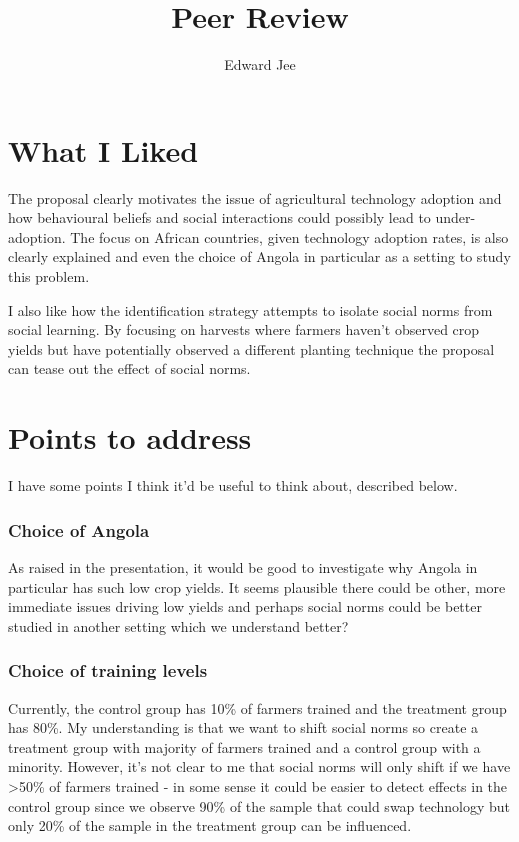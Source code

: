 \documentclass{article}
\title{Peer Review}
\author{Edward Jee}
\begin{document}
\maketitle



\section*{What I Liked}


The proposal clearly motivates the issue of agricultural technology adoption and 
how behavioural beliefs and social interactions could possibly lead to 
under-adoption. The focus on African countries, given technology adoption rates, 
is also clearly explained and even the choice of Angola in particular as a 
setting to study this problem.


I also like how the identification strategy attempts to isolate social norms 
from social learning. By focusing on harvests where farmers haven't observed 
crop yields but have potentially observed a different planting technique the 
proposal can tease out the effect of social norms. 

\section*{Points to address}


I have some points I think it'd be useful to think about, described below.


\subsubsection*{Choice of Angola}
As raised in the presentation, it would be good to investigate why Angola in 
particular has such low crop yields. It seems plausible there could be other, 
more immediate issues driving low yields and perhaps social norms could be 
better studied in another setting which we understand better?



\subsubsection*{Choice of training levels}

Currently, the control group has 10\% of farmers trained and the treatment group 
has 80\%. My understanding is that we want to shift social norms so create a 
treatment group with majority of farmers trained and a control group with a 
minority. However, it's not clear to me that social norms will only shift if we 
have >50\% of farmers trained - in some sense it could be easier to detect 
effects in the control group since we observe 90\% of the sample that could 
swap technology but only 20\% of the sample in the treatment group can be 
influenced.
\end{document}
